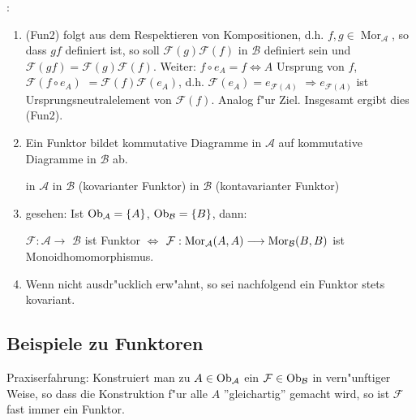 :{
\begin{enumerate}
\item(Fun2) folgt aus dem Respektieren von Kompositionen, 
d.h. $f,g\in \operatorname{Mor}_\mathcal{A}$, so dass $gf$ definiert ist,
so soll $\mathcal{F}(g)\mathcal{F}(f)$ in $\mathcal{B}$ definiert sein und
$\mathcal{F}(gf)= \mathcal{F}(g) \mathcal{F}(f)$.
Weiter: $f\circ e_A=f \Leftrightarrow A$ Ursprung von $f$, $\mathcal{F}(f\circ e_A)$
$=\mathcal{F}(f)\mathcal{F}(e_A)$, d.h. $\mathcal{F}(e_A)=e_{\mathcal{F}(A)}$
$\Rightarrow e_{\mathcal{F}(A)}$ ist Ursprungsneutralelement von $\mathcal{F}(f)$.
Analog f"ur Ziel. Insgesamt ergibt dies (Fun2).
\item Ein Funktor bildet kommutative Diagramme in $\mathcal{A}$ auf
kommutative Diagramme in $\mathcal{B}$ ab.

in $\mathcal{A}$ 
in $\mathcal{B}$ (kovarianter Funktor)
in $\mathcal{B}$ (kontavarianter Funktor) 

\item gesehen: Ist $\operatorname{Ob}_{\mathcal{A}}=\{A\}$, $\operatorname{Ob}_{\mathcal{B}}=\{B\}$, dann:

$\mathcal{F}: \mathcal{A}\longrightarrow$
$\mathcal{B}$ ist Funktor 
$\iff$ $\mathcal{F}: \Mor(A;A;A)\longrightarrow \Mor(B;B;B)$ 
ist Monoidhomomorphismus.
\item Wenn nicht ausdr"ucklich erw"ahnt, so sei nachfolgend ein Funktor stets kovariant.
\end{enumerate}
}

\subsection{Beispiele zu Funktoren}
Praxiserfahrung: Konstruiert man zu $A\in \operatorname{Ob}_{\mathcal{A}}$ ein $\mathcal{F}\in \operatorname{Ob}_{\mathcal{B}}$
in vern"unftiger Weise, so dass die Konstruktion f"ur alle $A$ ''gleichartig''
gemacht wird, so ist $\mathcal{F}$ fast immer ein Funktor.

